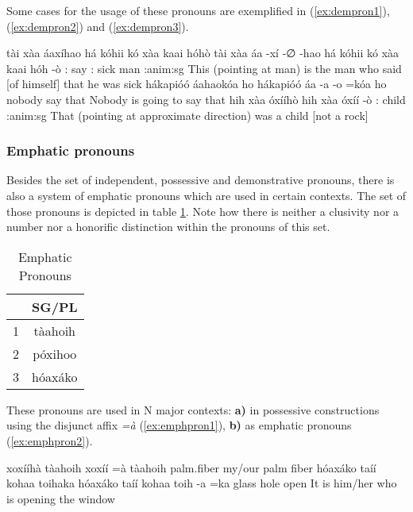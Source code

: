 \documentclass[a4paper, 12pt, oneside]{memoir}
\newcommand{\emh}[1]{\textit{#1}}
\begin{document}
Some cases for the usage of these pronouns are exemplified in (\ref{ex:dempron1}), (\ref{ex:dempron2}) and (\ref{ex:dempron3}).
\begin{examples}
\ex \label{ex:dempron1}
\words tài xàa áaxíhao há kóhii kó xàa kaai hóhò
\bits tài xàa áa -xí -∅ -hao há kóhii kó xàa kaai hóh -ò  
\gloss {\Dem}:{\Prox} {\Cop} say {\Rpasto} {\St} {\Dem} {\Cngr} {\C} {\Tsm}:{\Subject} {\Cop} sick man {\Cl}:anim:sg
\tr This (pointing at man) is the man who said [of himself] that he was sick
\ex \label{ex:dempron2}
\words hákapióó áahaokóa ho
\bits hákapióó áa -a -o =kóa ho
\gloss nobody say {\St} {\Fut} {\Decl} that
\tr Nobody is going to say that
\ex \label{ex:dempron3}
\words hih xàa óxííhò
\bits hih xàa óxíí -ò 
\gloss  {\Dem}:{\Nvis} {\Cop} child {\Cl}:anim:sg
\tr That (pointing at approximate direction) was a child [not a rock]
\end{examples}
\subsubsection{Emphatic pronouns}
Besides the set of independent, possessive and demonstrative pronouns, there is also a system of emphatic pronouns which are used in certain contexts. The set of those pronouns is depicted in table \ref{t:emphpron}. Note how there is neither a clusivity nor a number nor a honorific distinction within the pronouns of this set.
\begin{table}[H]
    \begin{centering}
    \begin{tabular}{@{}lc@{}}
    \toprule
    \multicolumn{1}{c}{} & SG/PL    \\ \midrule
    1                    & tàahoih  \\
    2                    & póxihoo  \\
    3                    & hóaxáko \\ \bottomrule
    \end{tabular}
    \caption{Emphatic Pronouns}
    \label{t:emphpron}
    \end{centering}
\end{table}
These pronouns are used in N major contexts: \textbf{a)} in possessive constructions using the disjunct affix \emh{=à} (\ref{ex:emphpron1}), \textbf{b)} as emphatic pronouns (\ref{ex:emphpron2}). 
\begin{examples}
    \ex \label{ex:emphpron1}
    \words xoxííhà tàahoih
    \bits xoxíí =à tàahoih
    \gloss palm.fiber {\Link} {\Ff}
    \tr my/our palm fiber
    \ex \label{ex:emphpron2}
    \words hóaxáko taíí kohaa toihaka 
    \bits hóaxáko taíí kohaa toih -a =ka 
    \gloss {\Tt} glass hole open {\St} {\Decl}
    \tr It is him/her who is opening the window
\end{examples}
\end{document}
